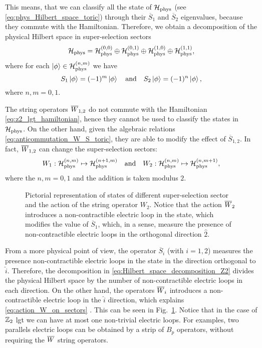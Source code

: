 This means, that we can classify all the state of $\mathcal{H}_{\text{phys}}$ (see \eqref{eq:phys_Hilbert_space_toric}) through their $\overline{S}_1$ and $\overline{S}_2$ eigenvalues, because they commute with the Hamiltonian.
Therefore, we obtain a decomposition of the physical Hilbert space in super-selection sectors
\begin{equation}
    \mathcal{H}_{\text{phys}} = \mathcal{H}_{\text{phys}}^{(0,0)} \oplus \mathcal{H}_{\text{phys}}^{(0,1)} \oplus \mathcal{H}_{\text{phys}}^{(1,0)} \oplus \mathcal{H}_{\text{phys}}^{(1,1)},
    \label{eq:Hilbert_space_decomposition_Z2}
\end{equation}
where for each $\ket{\phi} \in \mathcal{H}_{\text{phys}}^{(n,m)}$ we have
\begin{equation}
    S_1 \ket{\phi} = (-1)^{m} \ket{\phi}
    \qand
    S_2 \ket{\phi} = (-1)^{n} \ket{\phi},
\end{equation}
where $n, m = 0, 1$.

The string operators $\overline{W}_{1,2}$ do not commute with the Hamiltonian \eqref{eq:z2_lgt_hamiltonian}, hence they cannot be used to classify the states in $\mathcal{H}_{\text{phys}}$.
On the other hand, given the algebraic relations \eqref{eq:anticommutation_W_S_toric}, they are able to modify the effect of $\overline{S}_{1,2}$.
In fact, $\overline{W}_{1,2}$ can change the super-selection sectors:
\begin{equation}
    W_1 : \Hphys^{(n,m)} \mapsto \Hphys^{(n+1,m)}
    \qand
    W_2 : \Hphys^{(n,m)} \mapsto \Hphys^{(n,m+1)},
    \label{eq:action_W_on_sectors}
\end{equation}
where the $n,m = 0, 1$ and the addition is taken modulus $2$.


\begin{figure}[t]
    \centering
    
    \vspace*{-0.5cm}
    \caption[States in different super-selection sectors]{%
        Pictorial representation of states of different super-selection sector and the action of the string operator $W_2$.
        Notice that the action $\overline{W}_2$ introduces a non-contractible electric loop in the state, which modifies the value of $\overline{S}_1$, which, in a sense, measure the presence of non-contractible electric loops in the orthogonal direction $\hat{2}$.%
        }
    \label{fig:sector_mapping}
\end{figure}

From a more physical point of view, the operator $\overline{S}_i$ (with $i=1,2$) measures the presence non-contractible electric loops in the state in the direction orthogonal to $\hat{i}$.
Therefore, the decomposition in \eqref{eq:Hilbert_space_decomposition_Z2} divides the physical Hilbert space by the number of non-contractible electric loops in each direction.
On the other hand, the operators $\overline{W}_i$ introduces a non-contractible electric loop in the $\hat{i}$ direction, which explains \eqref{eq:action_W_on_sectors} .
This can be seen in Fig.~\ref{fig:sector_mapping}.
Notice that in the case of $\mathbb{Z}_2$ \ac{lgt} we can have at most one non-trivial electric loops.
For examples, two parallels electric loops can be obtained by a strip of $B_p$ operators, without requiring the $\overline{W}$ string operators.
